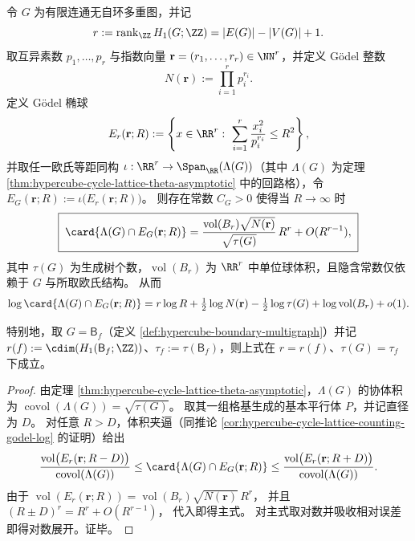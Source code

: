 \begin{corollary}\label{cor:hypercube-cycle-lattice-godel-ellipsoid-counting}
令 \(G\) 为有限连通无自环多重图，并记
\[
r:=\operatorname{rank}_{\ZZ}H_1(G;\ZZ)=|E(G)|-|V(G)|+1.
\]
取互异素数 \(p_1,\dots,p_r\) 与指数向量 \(\mathbf r=(r_1,\dots,r_r)\in\NN^r\)，并定义 Gödel 整数
\[
N(\mathbf r):=\prod_{i=1}^{r}p_i^{r_i}.
\]
定义 Gödel 椭球
\[
E_r(\mathbf r;R):=\left\{x\in\RR^r:\ \sum_{i=1}^{r}\frac{x_i^2}{p_i^{r_i}}\le R^2\right\},
\]
并取任一欧氏等距同构 \(\iota:\RR^r\to \Span_{\RR}(\Lambda(G))\)（其中 \(\Lambda(G)\) 为定理 \ref{thm:hypercube-cycle-lattice-theta-asymptotic} 中的回路格），令
\(
E_G(\mathbf r;R):=\iota\bigl(E_r(\mathbf r;R)\bigr)
\)。
则存在常数 \(C_G>0\) 使得当 \(R\to\infty\) 时
\[
\boxed{\;
\card{\Lambda(G)\cap E_G(\mathbf r;R)}
=\frac{\operatorname{vol}(B_r)\sqrt{N(\mathbf r)}}{\sqrt{\tau(G)}}\,R^r
+O(R^{r-1}),\;}
\]
其中 \(\tau(G)\) 为生成树个数，\(\operatorname{vol}(B_r)\) 为 \(\RR^r\) 中单位球体积，且隐含常数仅依赖于 \(G\) 与所取欧氏结构。
从而
\[
\log\card{\Lambda(G)\cap E_G(\mathbf r;R)}
=r\log R+\tfrac12\log N(\mathbf r)-\tfrac12\log\tau(G)+\log\operatorname{vol}(B_r)+o(1).
\]
\par
特别地，取 \(G=\mathsf B_f\)（定义 \ref{def:hypercube-boundary-multigraph}）并记
\(
r(f):=\cdim(H_1(\mathsf B_f;\ZZ))
\)、\(
\tau_f:=\tau(\mathsf B_f)
\)，则上式在 \(r=r(f)\)、\(\tau(G)=\tau_f\) 下成立。
\end{corollary}

\begin{proof}
由定理 \ref{thm:hypercube-cycle-lattice-theta-asymptotic}，\(\Lambda(G)\) 的协体积为 \(\operatorname{covol}(\Lambda(G))=\sqrt{\tau(G)}\)。
取其一组格基生成的基本平行体 \(P\)，并记直径为 \(D\)。
对任意 \(R>D\)，体积夹逼（同推论 \ref{cor:hypercube-cycle-lattice-counting-godel-log} 的证明）给出
\[
\frac{\operatorname{vol}\bigl(E_r(\mathbf r;R-D)\bigr)}{\operatorname{covol}(\Lambda(G))}
\le
\card{\Lambda(G)\cap E_G(\mathbf r;R)}
\le
\frac{\operatorname{vol}\bigl(E_r(\mathbf r;R+D)\bigr)}{\operatorname{covol}(\Lambda(G))}.
\]
由于
\(
\operatorname{vol}(E_r(\mathbf r;R))=\operatorname{vol}(B_r)\sqrt{N(\mathbf r)}\,R^r
\)，
并且
\(
(R\pm D)^r=R^r+O(R^{r-1})
\)，
代入即得主式。
对主式取对数并吸收相对误差即得对数展开。证毕。
\end{proof}

\endinput
